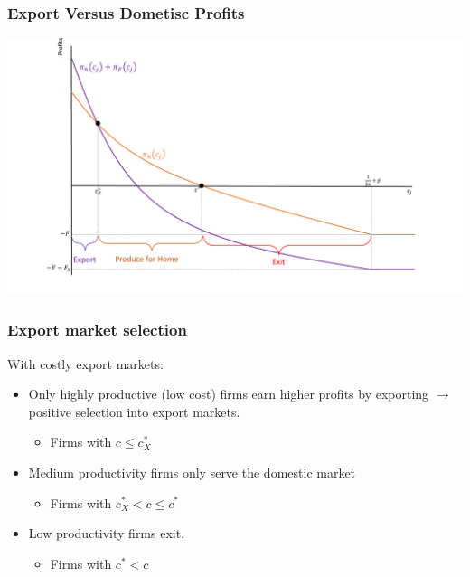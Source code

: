 \documentclass{beamer}
\begin{document}
\begin{frame}
	\frametitle{Export Versus Dometisc Profits}
	\includegraphics[scale=0.32]{SL4_10.pdf}
	
\end{frame}


\begin{frame}
	\frametitle{Export market selection}
With costly export markets:
	\begin{itemize}
		\item Only highly productive (low cost) firms earn higher profits by exporting	$\rightarrow$ positive selection into export markets.
			\begin{itemize}
				\item Firms with $c\leq c^*_X$
			\end{itemize}
		\item Medium productivity firms only serve the domestic market
					\begin{itemize}
						\item Firms with $c^*_X<c\leq c^*$
					\end{itemize}
		\item Low productivity firms exit.
							\begin{itemize}
								\item Firms with $c^*<c$
							\end{itemize}
	\end{itemize}
\end{frame}
	
\end{document}

